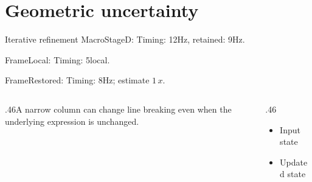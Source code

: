 \documentclass[9pt,aspectratio=43]{beamer}
\newcommand{\fuzzlayerA}[1]{\textrm{#1}}
\newcommand{\fuzzterm}[1]{\fuzzlayerA{#1}}
\newcommand{\fuzzpair}[2]{\fuzzterm{#1}: #2}
\newcommand{\fuzzunit}{Hz}
\let\fuzzoriginalunit\fuzzunit
\newcommand{\fuzzcoefficient}{1}
\newcommand{\fuzzscale}[2][\fuzzcoefficient]{#1\,#2}
\begin{document}
\section{Geometric uncertainty}
\begin{frame}[t]{Iterative refinement}
\fuzzpair{MacroStageD}{Timing: 12\fuzzunit, retained: 9\fuzzoriginalunit.}\par
{\renewcommand{\fuzzunit}{local}\fuzzpair{FrameLocal}{Timing: 5\fuzzunit.}\par}
\fuzzpair{FrameRestored}{Timing: 8\fuzzunit; estimate $\fuzzscale{x}$.}\par
\begin{columns}[T]\begin{column}{.46\textwidth}A narrow column can change line breaking even when the underlying expression is unchanged.\end{column}\begin{column}{.46\textwidth}\begin{itemize}\item Input state\item Updated state\end{itemize}\end{column}\end{columns}
\end{frame}
\end{document}
